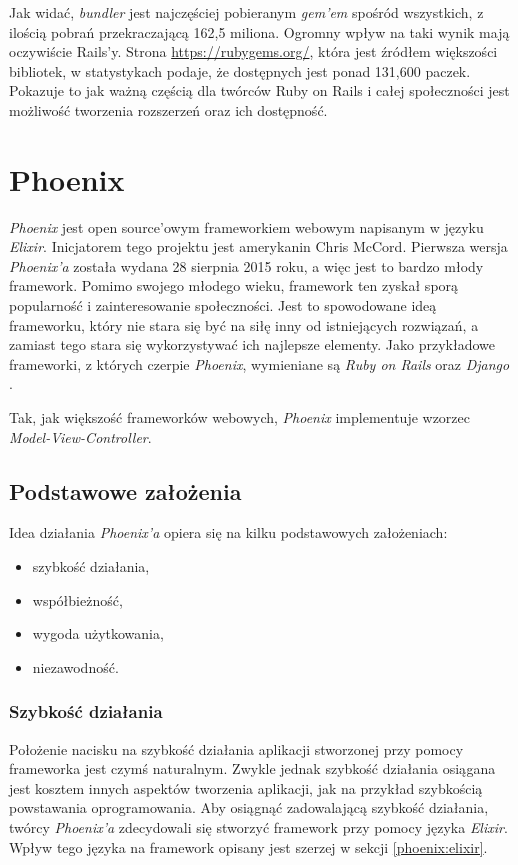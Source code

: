 \documentclass[mgr,oneside]{mgr}
\begin{document}
Jak widać, \textit{bundler} jest najczęściej pobieranym \textit{gem'em} spośród wszystkich, z ilością pobrań przekraczającą 162,5 miliona. Ogromny wpływ na taki wynik mają oczywiście Rails'y. Strona \url{https://rubygems.org/}, która jest źródłem większości bibliotek, w statystykach podaje, że dostępnych jest ponad 131,600 paczek. Pokazuje to jak ważną częścią dla twórców Ruby on Rails i całej społeczności jest możliwość tworzenia rozszerzeń oraz ich dostępność.

\section{Phoenix} %

\textit{Phoenix} jest open source'owym frameworkiem webowym napisanym w języku \textit{Elixir}. Inicjatorem tego projektu jest amerykanin Chris McCord. Pierwsza wersja \textit{Phoenix'a} została wydana 28 sierpnia 2015 roku, a więc jest to bardzo młody framework. Pomimo swojego młodego wieku, framework ten zyskał sporą popularność i zainteresowanie społeczności. Jest to spowodowane ideą frameworku, który nie stara się być na siłę inny od istniejących rozwiązań, a zamiast tego stara się wykorzystywać ich najlepsze elementy. Jako przykładowe frameworki, z których czerpie \textit{Phoenix}, wymieniane są \textit{Ruby on Rails} oraz \textit{Django} \cite{phoenix_docs}.

Tak, jak większość frameworków webowych, \textit{Phoenix} implementuje wzorzec \textit{Model-View-Controller}.

\subsection{Podstawowe założenia}
Idea działania \textit{Phoenix'a} opiera się na kilku podstawowych założeniach:
\begin{itemize}
  \item szybkość działania,
  \item współbieżność,
  \item wygoda użytkowania,
  \item niezawodność.
\end{itemize}

\subsubsection{Szybkość działania}
Położenie nacisku na szybkość działania aplikacji stworzonej przy pomocy frameworka jest czymś naturalnym. Zwykle jednak szybkość działania osiągana jest kosztem innych aspektów tworzenia aplikacji, jak na przykład szybkością powstawania oprogramowania. Aby osiągnąć zadowalającą szybkość działania, twórcy \textit{Phoenix'a} zdecydowali się stworzyć framework przy pomocy języka \textit{Elixir}. Wpływ tego języka na framework opisany jest szerzej w sekcji \ref{phoenix:elixir}.
\end{document}
